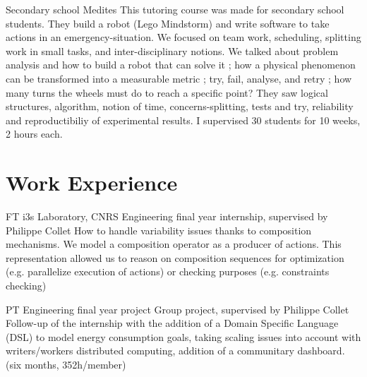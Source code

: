 \documentclass[10pt]{article} %
\begin{document}
\begin{paracol}{2}
{Secondary school} %
{Medites}  %
{This tutoring course was made for secondary school students. They build a robot (Lego Mindstorm) and write software to take actions in an emergency-situation. We focused on team work, scheduling, splitting work in small tasks, and inter-disciplinary notions. We talked about problem analysis and how to build a robot that can solve it ; how a physical phenomenon can be transformed into a measurable metric ; try, fail, analyse, and retry ; how many turns the wheels must do to reach a specific point? They saw logical structures, algorithm, notion of time, concerns-splitting, tests and try, reliability and reproductibiliy of experimental results. I supervised 30 students for 10 weeks, 2 hours each.} %




\section{Work Experience}





{FT} %
{i3s Laboratory, CNRS} %
{Engineering final year internship, supervised by Philippe Collet}  %
{How to handle variability issues thanks to composition mechanisms. We model a composition operator as a producer of actions. This representation allowed us to reason on composition sequences for optimization (e.g. parallelize execution of actions) or checking purposes (e.g. constraints checking)} %

{PT} %
{Engineering final year project} %
{Group project, supervised by Philippe Collet} %
{Follow-up of the internship with the addition of a Domain Specific Language (DSL) to model energy consumption goals, taking scaling issues into account with writers/workers distributed computing, addition of a communitary dashboard. (six months, 352h/member) } %


\end{paracol}
\end{document}
